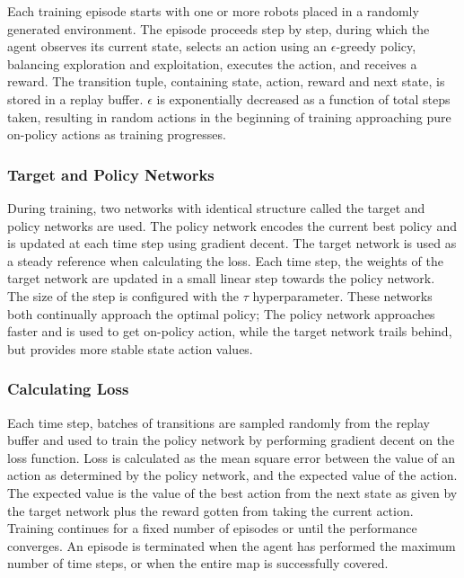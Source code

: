 Each training episode starts with one or more robots placed in a randomly generated environment. The episode proceeds step by step, during which the agent observes its current state, selects an action using an $\epsilon$-greedy policy, balancing exploration and exploitation, executes the action, and receives a reward. The transition tuple, containing state, action, reward and next state, is stored in a replay buffer. $\epsilon$ is exponentially decreased as a function of total steps taken, resulting in random actions in the beginning of training approaching pure on-policy actions as training progresses. \\

\subsubsection{Target and Policy Networks}
During training, two networks with identical structure called the target and policy networks are used. The policy network encodes the current best policy and is updated at each time step using gradient decent. The target network is used as a steady reference when calculating the loss. Each time step, the weights of the target network are updated in a small linear step towards the policy network. The size of the step is configured with the $\tau$ hyperparameter. These networks both continually approach the optimal policy; The policy network approaches faster and is used to get on-policy action, while the target network trails behind, but provides more stable state action values.

\subsubsection{Calculating Loss}
Each time step, batches of transitions are sampled randomly from the replay buffer and used to train the policy network by performing gradient decent on the loss function. Loss is calculated as the mean square error between the value of an action as determined by the policy network, and the expected value of the action. The expected value is the value of the best action from the next state as given by the target network plus the reward gotten from taking the current action. \\

Training continues for a fixed number of episodes or until the performance converges. An episode is terminated when the agent has performed the maximum number of time steps, or when the entire map is successfully covered.

